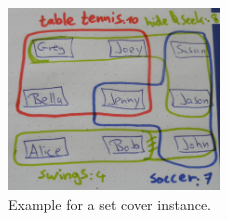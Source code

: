 \begin{figure}[ht]
  \centering
  \includegraphics[width=0.5\textwidth]{img/example_set_cover.jpg}
  \caption{\label{fig:example_set_cover}Example for a set cover instance.}
\end{figure}

